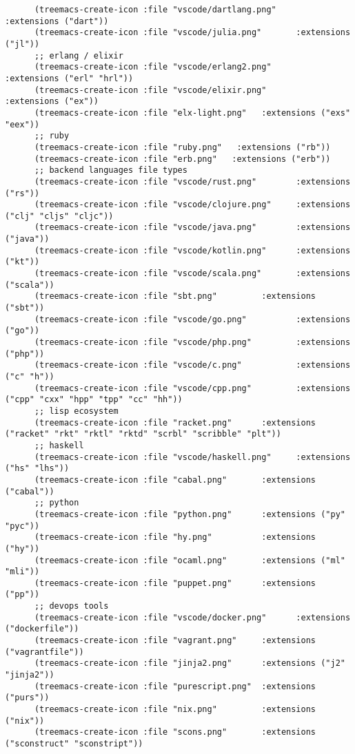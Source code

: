 \documentclass[11pt]{article}
\begin{document}
\begin{verbatim}
      (treemacs-create-icon :file "vscode/dartlang.png"        :extensions ("dart"))
      (treemacs-create-icon :file "vscode/julia.png"       :extensions ("jl"))
      ;; erlang / elixir
      (treemacs-create-icon :file "vscode/erlang2.png"      :extensions ("erl" "hrl"))
      (treemacs-create-icon :file "vscode/elixir.png"         :extensions ("ex"))
      (treemacs-create-icon :file "elx-light.png"   :extensions ("exs" "eex"))
      ;; ruby
      (treemacs-create-icon :file "ruby.png"   :extensions ("rb"))
      (treemacs-create-icon :file "erb.png"   :extensions ("erb"))
      ;; backend languages file types
      (treemacs-create-icon :file "vscode/rust.png"        :extensions ("rs"))
      (treemacs-create-icon :file "vscode/clojure.png"     :extensions ("clj" "cljs" "cljc"))
      (treemacs-create-icon :file "vscode/java.png"        :extensions ("java"))
      (treemacs-create-icon :file "vscode/kotlin.png"      :extensions ("kt"))
      (treemacs-create-icon :file "vscode/scala.png"       :extensions ("scala"))
      (treemacs-create-icon :file "sbt.png"         :extensions ("sbt"))
      (treemacs-create-icon :file "vscode/go.png"          :extensions ("go"))
      (treemacs-create-icon :file "vscode/php.png"         :extensions ("php"))
      (treemacs-create-icon :file "vscode/c.png"           :extensions ("c" "h"))
      (treemacs-create-icon :file "vscode/cpp.png"         :extensions ("cpp" "cxx" "hpp" "tpp" "cc" "hh"))
      ;; lisp ecosystem
      (treemacs-create-icon :file "racket.png"      :extensions ("racket" "rkt" "rktl" "rktd" "scrbl" "scribble" "plt"))
      ;; haskell
      (treemacs-create-icon :file "vscode/haskell.png"     :extensions ("hs" "lhs"))
      (treemacs-create-icon :file "cabal.png"       :extensions ("cabal"))
      ;; python
      (treemacs-create-icon :file "python.png"      :extensions ("py" "pyc"))
      (treemacs-create-icon :file "hy.png"          :extensions ("hy"))
      (treemacs-create-icon :file "ocaml.png"       :extensions ("ml" "mli"))
      (treemacs-create-icon :file "puppet.png"      :extensions ("pp"))
      ;; devops tools
      (treemacs-create-icon :file "vscode/docker.png"      :extensions ("dockerfile"))
      (treemacs-create-icon :file "vagrant.png"     :extensions ("vagrantfile"))
      (treemacs-create-icon :file "jinja2.png"      :extensions ("j2" "jinja2"))
      (treemacs-create-icon :file "purescript.png"  :extensions ("purs"))
      (treemacs-create-icon :file "nix.png"         :extensions ("nix"))
      (treemacs-create-icon :file "scons.png"       :extensions ("sconstruct" "sconstript"))

\end{verbatim}
\end{document}
